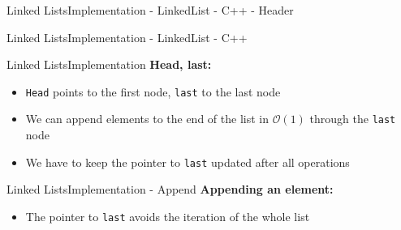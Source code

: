 
\begin{frame}[fragile]{Linked Lists}{Implementation - LinkedList - C++ - Header}
  
\end{frame}


\begin{frame}[fragile]{Linked Lists}{Implementation - LinkedList - C++}
  \vspace{-1.25em}
  
\end{frame}


\begin{frame}{Linked Lists}{Implementation}
  \textbf{Head, last:}
  \begin{itemize}
    \item
      \texttt{Head} points to the first node, \texttt{last} to the last node
    \item
      We can append elements to the end of the list in $\mathcal{O}(1)$ through
      the \texttt{last} node
    \item
      We have to keep the pointer to \texttt{last} updated after all operations
  \end{itemize}
  \begin{flushleft}
    
  \end{flushleft}
\end{frame}


\begin{frame}[fragile]{Linked Lists}{Implementation - Append}
  \textbf{Appending an element:}
  \begin{itemize}
    \item
      The pointer to \texttt{last} avoids the iteration of the whole list
      
  \end{itemize}
  \vspace{-2.0em}
  \begin{flushleft}
    
  \end{flushleft}
\end{frame}

